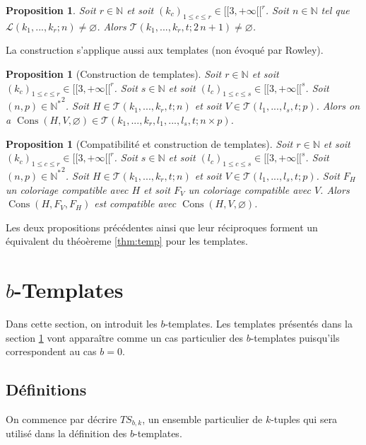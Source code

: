 \documentclass{article}
\newtheorem{proposition}[definition]{Proposition}
\DeclareMathOperator{\cons}{Cons}
\newcommand{\TS}{\mathit{TS}}
\begin{document}
\begin{proposition}
Soit \(r \in \mathbb{N}\) et soit \((k_c)_{1 \leqslant c \leqslant r} \in {[\![3, +\infty[\![}^r\). Soit \(n \in \mathbb{N}\) tel que \(\mathcal{L}(k_1, ..., k_r; n) \neq \varnothing\). Alors \(\mathcal{T}(k_1, ..., k_r, t; 2 \, n + 1) \neq \varnothing\).
\end{proposition}

La construction s'applique aussi aux templates (non évoqué par Rowley).

\begin{proposition}[Construction de templates]
Soit \(r \in \mathbb{N}\) et soit \((k_c)_{1 \leqslant c \leqslant r} \in {[\![3, +\infty[\![}^r\). Soit \(s \in \mathbb{N}\) et soit \((l_c)_{1 \leqslant c \leqslant s} \in {[\![3, +\infty[\![}^s\). Soit \((n, p) \in {\mathbb{N}^*}^2\). Soit \(H \in \mathcal{T}(k_1, ..., k_r, t; n)\) et soit \(V \in \mathcal{T}(l_1, ..., l_s, t; p)\). Alors on a \(\cons(H, V, \varnothing) \in \mathcal{T}(k_1, ..., k_r, l_1, ..., l_s, t; n \times p)\).
\end{proposition}

\begin{proposition}[Compatibilité et construction de templates]
Soit \(r \in \mathbb{N}\) et soit \((k_c)_{1 \leqslant c \leqslant r} \in {[\![3, +\infty[\![}^r\). Soit \(s \in \mathbb{N}\) et soit \((l_c)_{1 \leqslant c \leqslant s} \in {[\![3, +\infty[\![}^s\). Soit \((n, p) \in {\mathbb{N}^*}^2\). Soit \(H \in \mathcal{T}(k_1, ..., k_r, t; n)\) et soit \(V \in \mathcal{T}(l_1, ..., l_s, t; p)\). Soit \(F_H\) un coloriage compatible avec \(H\) et  soit \(F_V\) un coloriage compatible avec \(V\).
Alors  \(\cons(H, F_V, F_H)\) est compatible avec \(\cons(H, V, \varnothing)\).
\end{proposition}

Les deux propositions précédentes ainsi que leur réciproques forment un équivalent du théoèreme \ref{thm:temp} pour les templates.

\section{\(b\)-Templates}
\label{sec:b-temp}
Dans cette section, on introduit les \(b\)-templates. Les templates présentés dans la section \ref{sec:b-temp} vont apparaître comme un cas particulier des \(b\)-templates puisqu'ils correspondent au cas \(b = 0\).

\subsection{Définitions}
On commence par décrire \(\TS_{b,k}\), un ensemble particulier de \(k\)-tuples qui sera utilisé dans la définition des \(b\)-templates.
\end{document}
